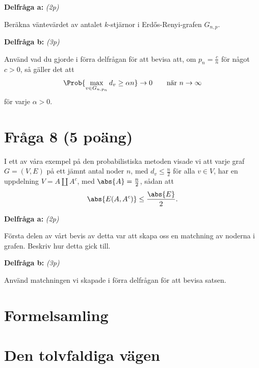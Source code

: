\documentclass[nobib]{tufte-handout}
\begin{document}
\noindent\textbf{Delfråga a:} \emph{(2p)}

Beräkna väntevärdet av antalet $k$-stjärnor i Erd\H{o}s-Renyi-grafen $G_{n,p}$.

\noindent\textbf{Delfråga b:} \emph{(3p)}

Använd vad du gjorde i förra delfrågan för att bevisa att, om $p_n = \frac{c}{n}$ för något $c > 0$, så gäller det att
$$\Prob{\max_{v \in G_{n,p_n}} d_v \geq \alpha n} \to 0\qquad\text{när }n\to\infty$$
för varje $\alpha > 0$.

\section{Fråga 8 (5 poäng)} %

I ett av våra exempel på den probabilistiska metoden visade vi att varje graf $G = (V, E)$ på ett jämnt antal noder $n$, med $d_v \leq \frac{n}{2}$ för alla $v \in V$, har en uppdelning $V = A \coprod A^c$, med $\abs{A} = \frac{n}{2}$, sådan att
$$\abs{E(A, A^c)} \leq \frac{\abs{E}}{2}.$$

\noindent\textbf{Delfråga a:} \emph{(2p)}

Första delen av vårt bevis av detta var att skapa oss en matchning av noderna i grafen. Beskriv hur detta gick till.

\noindent\textbf{Delfråga b:} \emph{(3p)}

Använd matchningen vi skapade i förra delfrågan för att bevisa satsen.

\pagebreak

\section{Formelsamling}

\section{Den tolvfaldiga vägen}
\end{document}
